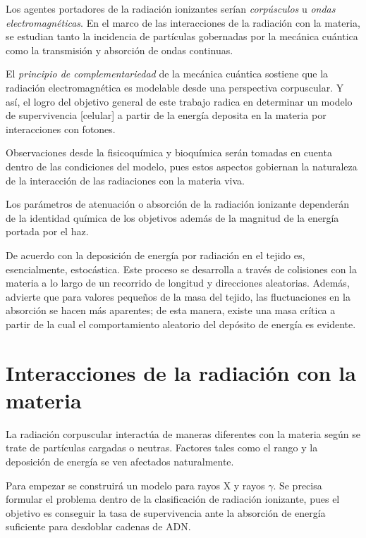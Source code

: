 \documentclass[12pt,letterpaper, oneside]{book}
\begin{document}
	Los agentes portadores de la radiación ionizantes serían \textit{corpúsculos} u \textit{ondas electromagnéticas}. En el marco de las interacciones de la radiación con la materia, se estudian tanto la incidencia de partículas gobernadas por la mecánica cuántica como la transmisión y absorción de ondas continuas.
	
	El \textit{principio de complementariedad} de la mecánica cuántica sostiene que la radiación electromagnética es modelable desde una perspectiva corpuscular. Y así, el logro del objetivo general de este trabajo radica en determinar un modelo de supervivencia [celular] a partir de la energía deposita en la materia por interacciones con fotones. 
	
	Observaciones desde la fisicoquímica y bioquímica serán tomadas en cuenta dentro de las condiciones del modelo, pues estos aspectos gobiernan la naturaleza de la interacción de las radiaciones con la materia viva\cite{Bleehen.2007}. 
	
	Los parámetros de atenuación o absorción de la radiación ionizante dependerán de la identidad química de los objetivos además de la magnitud de la energía portada por el haz\cite{Mayles.2007,IAEA.2005}.
	
	De acuerdo con \cite{Mayles.2007} la deposición de energía por radiación en el tejido es, esencialmente, estocástica. Este proceso se desarrolla a través de colisiones con la materia a lo largo de un recorrido de longitud y direcciones aleatorias. Además, \cite{Mayles.2007} advierte que para valores pequeños de la masa del tejido, las fluctuaciones en la absorción se hacen más aparentes; de esta manera, existe una masa crítica a partir de la cual el comportamiento aleatorio del depósito de energía es evidente. 
	
	\section{Interacciones de la radiación con la materia}
	La radiación corpuscular interactúa de maneras diferentes con la materia según se trate de partículas cargadas o neutras. Factores tales como el rango y la deposición de energía se ven afectados naturalmente. 
	
	Para empezar se construirá un modelo para rayos X y rayos $\gamma$. Se precisa formular el problema dentro de la clasificación de radiación ionizante, pues el objetivo es conseguir la tasa de supervivencia ante la absorción de energía suficiente para desdoblar cadenas de ADN. 
	
\end{document}
